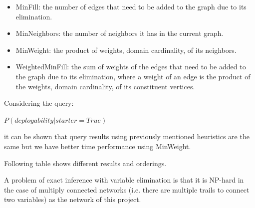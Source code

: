 \documentclass[a4paper,10pt]{report}
\begin{document}
\begin{itemize}
    \item MinFill: the number of edges that need to be added to the graph due to its elimination.
    \item MinNeighbors: the number of neighbors it has in the current graph.
    \item MinWeight: the product of weights, domain cardinality, of its neighbors.
    \item WeightedMinFill: the sum of weights of the edges that need to be added to the graph due to its elimination, where a weight of an edge is the product of the weights, domain cardinality, of its constituent vertices.
\end{itemize}

Considering the query:

\begin{center}
    $P(deployability|starter=True)$
\end{center}

it can be shown that query results using previously mentioned heuristics are the same but we have better time performance using MinWeight.

Following table shows different results and orderings.\newline


A problem of exact inference with variable elimination is that it is NP-hard in the case of multiply connected networks (i.e. there are multiple trails to connect two variables) as the network of this project.
\end{document}

